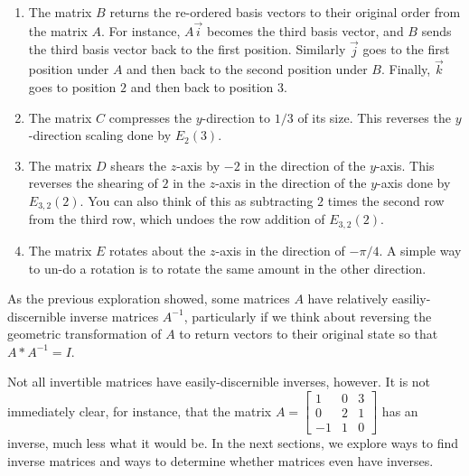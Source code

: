 \documentclass{ximera}
\begin{document}
\begin{exploration}
  \begin{feedback}
    \begin{enumerate}
      \item The matrix $B$ returns the re-ordered basis vectors to their original order from the matrix $A$. For instance, $A\vec{i}$ becomes the third basis vector, and $B$ sends the third basis vector back to the first position. Similarly $\vec{j}$ goes to the first position under $A$ and then back to the second position under $B$. Finally, $\vec{k}$ goes to position $2$ and then back to position $3$.
      \item The matrix $C$ compresses the $y$-direction to $1/3$ of its size. This reverses the $y$-direction scaling done by $E_{2}(3)$. 
      \item The matrix $D$ shears the $z$-axis by $-2$ in the direction of the $y$-axis. This reverses the shearing of $2$ in the $z$-axis in the direction of the $y$-axis done by $E_{3,2}(2)$. You can also think of this as subtracting $2$ times the second row from the third row, which undoes the row addition of $E_{3,2}(2)$.
      \item The matrix $E$ rotates about the $z$-axis in the direction of $-\pi/4$. A simple way to un-do a rotation is to rotate the same amount in the other direction.
    \end{enumerate}
  \end{feedback}

\end{exploration}

As the previous exploration showed, some matrices $A$ have relatively easiliy-discernible inverse matrices $A^{-1}$, particularly if we think about reversing the geometric transformation of $A$ to return vectors to their original state so that $A*A^{-1}=I$. 

Not all invertible matrices have easily-discernible inverses, however. It is not immediately clear, for instance, that the matrix $A=\begin{bmatrix}
  1&0&3\\0&2&1\\-1&1&0
\end{bmatrix}$ has an inverse, much less what it would be. In the next sections, we explore ways to find inverse matrices and ways to determine whether matrices even have inverses.
\end{document}
